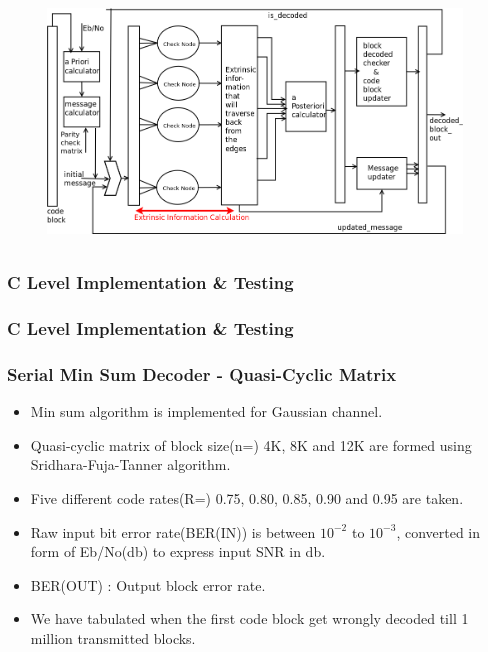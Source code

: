 \documentclass[xcolor=dvipsname]
{beamer}
\begin{document}
\begin{frame}[t]
\begin{figure}
       \includegraphics[height=6.5cm,width=11cm]{minSum}
       \end{figure}
\end{frame}
\subsubsection{C Level Implementation \& Testing}


\begin{frame}[t]
\frametitle{C Level Implementation \& Testing }

\end{frame}
\begin{frame}[t]
\frametitle{ Serial Min Sum Decoder - Quasi-Cyclic Matrix }
\begin{itemize}
\item Min sum algorithm is implemented for Gaussian channel. 
\item Quasi-cyclic matrix of block size(n=) 4K, 8K and 12K  are formed using Sridhara-Fuja-Tanner algorithm.
\item Five different code rates(R=) 0.75, 0.80, 0.85, 0.90 and 0.95 are taken.
\item Raw input bit error rate(BER(IN)) is between $10^{-2}$ to $10^{-3}$, converted in form of Eb/No(db) to express input SNR in db. 
\item BER(OUT) : Output block error rate.
\item We have tabulated when the first code block get wrongly decoded till 1 million transmitted blocks.
\end{itemize}
\end{frame}
	
\end{document}
